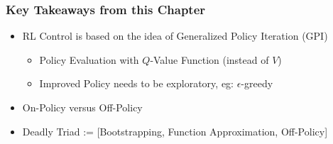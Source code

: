 \documentclass[handout]{beamer}
\begin{document}
\begin{frame}
\frametitle{Key Takeaways from this Chapter}
\pause
\begin{itemize}[<+->]
\item RL Control is based on the idea of Generalized Policy Iteration (GPI)
\begin{itemize}[<+->]
\item Policy Evaluation with $Q$-Value Function (instead of $V$)
\item Improved Policy needs to be exploratory, eg: $\epsilon$-greedy
\end{itemize}
\item On-Policy versus Off-Policy
\item Deadly Triad := [Bootstrapping, Function Approximation, Off-Policy]
\end{itemize}
\end{frame}
\end{document}
